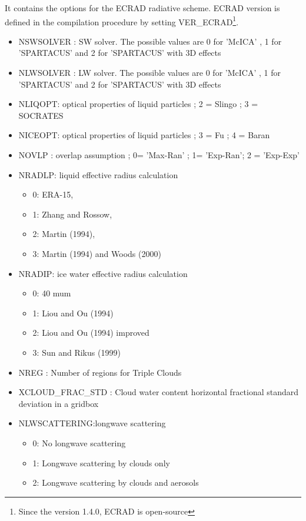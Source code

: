 It contains the options for the ECRAD radiative scheme. ECRAD version is defined in the compilation procedure by setting VER\_ECRAD\footnote{Since the version 1.4.0, ECRAD is open-source}.
\begin{itemize}
\item NSWSOLVER : SW solver. The possible values are 0 for 'McICA' , 1 for 'SPARTACUS' and 2 for 'SPARTACUS' with 3D effects
\item NLWSOLVER : LW solver. The possible values are 0 for 'McICA' , 1 for 'SPARTACUS' and 2 for 'SPARTACUS' with 3D effects
\item NLIQOPT: optical properties of liquid particles ; 2 = Slingo ; 3 = SOCRATES
\item NICEOPT: optical properties of liquid particles ; 3 = Fu ; 4 = Baran
\item NOVLP :  overlap assumption ; 0= 'Max-Ran' ; 1= 'Exp-Ran'; 2 = 'Exp-Exp'
\item NRADLP: liquid effective radius calculation
	\begin{itemize}
		\item 0: ERA-15, 
		\item 1: Zhang and Rossow,
		\item 2: Martin (1994), 
		\item 3: Martin (1994) and Woods (2000)
	\end{itemize}
\item NRADIP: ice water effective radius calculation
	\begin{itemize}
		\item 0: 40 mum
		\item 1: Liou and Ou (1994)
		\item 2: Liou and Ou (1994) improved
		\item 3: Sun and Rikus (1999)
	\end{itemize}
\item NREG : Number of regions for Triple Clouds
\item XCLOUD\_FRAC\_STD :  Cloud water content horizontal fractional standard deviation in a gridbox
\item NLWSCATTERING:longwave scattering
\begin{itemize}
\item 0: No longwave scattering
\item 1: Longwave scattering by clouds only
\item 2: Longwave scattering by clouds and aerosols
\end{itemize}


\end{itemize}
